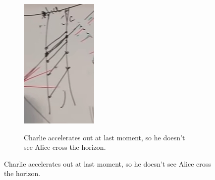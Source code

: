 \documentclass[]{article}
\begin{document}
{\begin{figure}[H]
\begin{subfigure}[t]{0.3\textwidth}
		\includegraphics[width=\textwidth]{gr-7-alice-charlie-crossing-horizon}
	\end{subfigure}
	\;
	\begin{subfigure}[t]{0.3\textwidth}
		\caption{Charlie accelerates out at last moment, so he doesn't see Alice cross the horizon.}\label{fig:gr-7-accelerating-charlie}

\end{subfigure}
\end{figure}}
\end{document}
